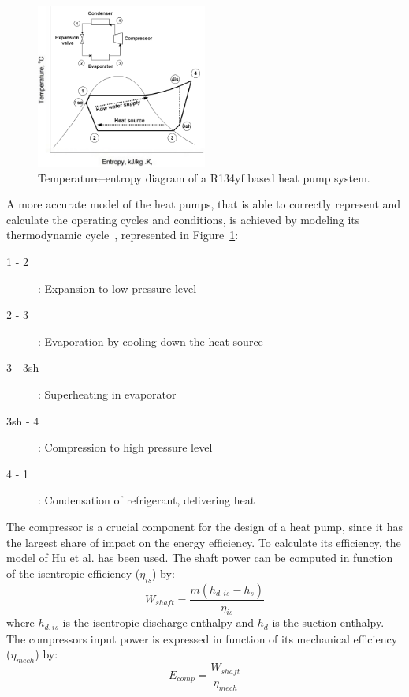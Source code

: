 \documentclass{article}
\begin{document}
\begin{figure}[htp]
	\centering
	\includegraphics[width=0.5\textwidth]{HP_cylce_ref.png}
	\caption{Temperature–entropy diagram of a R134yf based heat pump system.}
	\label{fig:hp_ref}
\end{figure}

A more accurate model of the heat pumps, that is able to correctly represent and calculate the operating cycles and conditions, is achieved by modeling its thermodynamic cycle~\cite{demierreModelingExperimentalInvestigation2014}, represented in Figure~\ref{fig:hp_ref}:

\begin{description}
	\item [1 - 2]: Expansion to low pressure level
	\item [2 - 3]: Evaporation by cooling down the heat source
	\item [3 - 3sh]: Superheating in evaporator
	\item [3sh - 4]: Compression to high pressure level
	\item [4 - 1]: Condensation of refrigerant, delivering heat
\end{description}

The compressor is a crucial component for the design of a heat pump, since it has the largest share of impact on the energy efficiency. To calculate its efficiency, the model of Hu et al.\cite{huExtremumSeekingControl2015} has been used. The shaft power can be computed in function of the isentropic efficiency ($\eta_{is}$) by:
\begin{equation}
W_{shaft} = \frac{\dot{m}(h_{d,is}-h_{s})}{\eta_{is}} 
\end{equation}
where $h_{d,is}$ is the isentropic discharge enthalpy and $h_{d}$ is the suction enthalpy. The compressors input power is expressed in function of its mechanical efficiency ($\eta_{mech}$) by:
\begin{equation}
E_{comp} = \frac{W_{shaft}}{\eta_{mech}}  
\end{equation}
\end{document}
